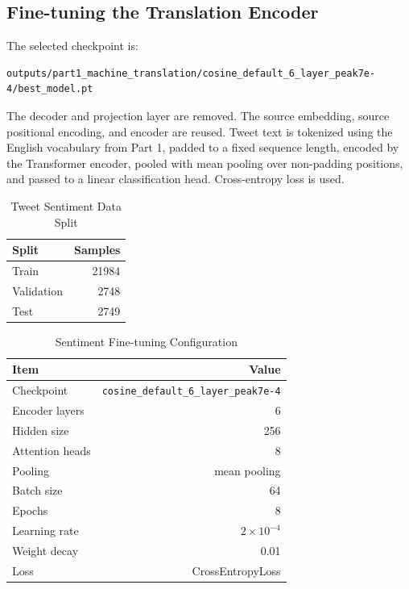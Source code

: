 \documentclass[a4paper,12pt]{article}
\begin{document}
\subsection{Fine-tuning the Translation Encoder}

The selected checkpoint is:
\begin{lstlisting}
outputs/part1_machine_translation/cosine_default_6_layer_peak7e-4/best_model.pt
\end{lstlisting}

The decoder and projection layer are removed. The source embedding, source positional encoding, and encoder are reused. Tweet text is tokenized using the English vocabulary from Part 1, padded to a fixed sequence length, encoded by the Transformer encoder, pooled with mean pooling over non-padding positions, and passed to a linear classification head. Cross-entropy loss is used.

\begin{table}[H]
\centering
\caption{Tweet Sentiment Data Split}
\label{tab:sentiment-data-en}
\begin{tabular}{lr}
\toprule
Split & Samples \\
\midrule
Train & 21984 \\
Validation & 2748 \\
Test & 2749 \\
\bottomrule
\end{tabular}
\end{table}

\begin{table}[H]
\centering
\caption{Sentiment Fine-tuning Configuration}
\label{tab:sentiment-config-en}
\begin{tabular}{lr}
\toprule
Item & Value \\
\midrule
Checkpoint & \texttt{cosine\_default\_6\_layer\_peak7e-4} \\
Encoder layers & 6 \\
Hidden size & 256 \\
Attention heads & 8 \\
Pooling & mean pooling \\
Batch size & 64 \\
Epochs & 8 \\
Learning rate & $2\times10^{-4}$ \\
Weight decay & 0.01 \\
Loss & CrossEntropyLoss \\
\bottomrule
\end{tabular}
\end{table}
\end{document}

